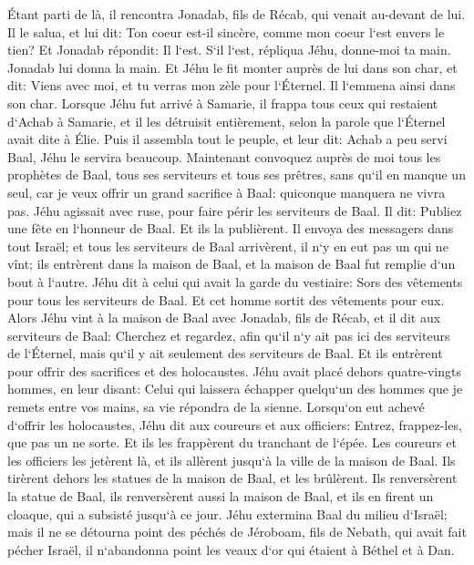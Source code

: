 \verse Étant parti de là, il rencontra Jonadab, fils de Récab, qui venait au-devant de lui. Il le salua, et lui dit: Ton coeur est-il sincère, comme mon coeur l`est envers le tien? Et Jonadab répondit: Il l`est. S`il l`est, répliqua Jéhu, donne-moi ta main. Jonadab lui donna la main. Et Jéhu le fit monter auprès de lui dans son char, 
\verse et dit: Viens avec moi, et tu verras mon zèle pour l`Éternel. Il l`emmena ainsi dans son char. 
\verse Lorsque Jéhu fut arrivé à Samarie, il frappa tous ceux qui restaient d`Achab à Samarie, et il les détruisit entièrement, selon la parole que l`Éternel avait dite à Élie. 
\verse Puis il assembla tout le peuple, et leur dit: Achab a peu servi Baal, Jéhu le servira beaucoup. 
\verse Maintenant convoquez auprès de moi tous les prophètes de Baal, tous ses serviteurs et tous ses prêtres, sans qu`il en manque un seul, car je veux offrir un grand sacrifice à Baal: quiconque manquera ne vivra pas. Jéhu agissait avec ruse, pour faire périr les serviteurs de Baal. 
\verse Il dit: Publiez une fête en l`honneur de Baal. Et ils la publièrent. 
\verse Il envoya des messagers dans tout Israël; et tous les serviteurs de Baal arrivèrent, il n`y en eut pas un qui ne vînt; ils entrèrent dans la maison de Baal, et la maison de Baal fut remplie d`un bout à l`autre. 
\verse Jéhu dit à celui qui avait la garde du vestiaire: Sors des vêtements pour tous les serviteurs de Baal. Et cet homme sortit des vêtements pour eux. 
\verse Alors Jéhu vint à la maison de Baal avec Jonadab, fils de Récab, et il dit aux serviteurs de Baal: Cherchez et regardez, afin qu`il n`y ait pas ici des serviteurs de l`Éternel, mais qu`il y ait seulement des serviteurs de Baal. 
\verse Et ils entrèrent pour offrir des sacrifices et des holocaustes. Jéhu avait placé dehors quatre-vingts hommes, en leur disant: Celui qui laissera échapper quelqu`un des hommes que je remets entre vos mains, sa vie répondra de la sienne. 
\verse Lorsqu`on eut achevé d`offrir les holocaustes, Jéhu dit aux coureurs et aux officiers: Entrez, frappez-les, que pas un ne sorte. Et ils les frappèrent du tranchant de l`épée. Les coureurs et les officiers les jetèrent là, et ils allèrent jusqu`à la ville de la maison de Baal. 
\verse Ils tirèrent dehors les statues de la maison de Baal, et les brûlèrent. 
\verse Ils renversèrent la statue de Baal, ils renversèrent aussi la maison de Baal, et ils en firent un cloaque, qui a subsisté jusqu`à ce jour. 
\verse Jéhu extermina Baal du milieu d`Israël; 
\verse mais il ne se détourna point des péchés de Jéroboam, fils de Nebath, qui avait fait pécher Israël, il n`abandonna point les veaux d`or qui étaient à Béthel et à Dan. 

